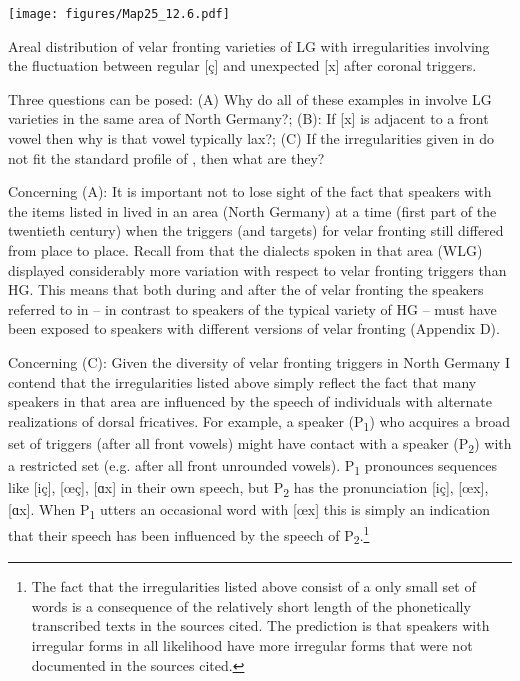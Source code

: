 \begin{map}
\texttt{[image: figures/Map25\_12.6.pdf]}
\caption[Areal distribution of velar fronting varieties of Low German]{Areal distribution of velar fronting varieties of LG with irregularities involving the fluctuation between regular [ç] and unexpected [x] after coronal triggers.}\label{map:25}
\end{map}

Three questions can be posed: (A) Why do all of these examples in  involve LG varieties in the same area of North Germany?; (B): If [x] is adjacent to a front vowel then why is that vowel typically lax?; (C) If the irregularities given in  do not fit the standard profile of , then what are they?

Concerning (A): It is important not to lose sight of the fact that speakers with the items listed in  lived in an area (North Germany) at a time (first part of the twentieth century) when the triggers (and targets) for velar fronting still differed from place to place. Recall from  that the dialects spoken in that area (WLG) displayed considerably more variation with respect to velar fronting triggers than HG. This means that both during and after the  of velar fronting the speakers referred to in  -- in contrast to speakers of the typical variety of HG -- must have been exposed to speakers with different versions of velar fronting (Appendix D).

Concerning (C): Given the diversity of velar fronting triggers in North Germany I contend that the irregularities listed above simply reflect the fact that many speakers in that area are influenced by the speech of individuals with alternate realizations of dorsal fricatives. For example, a speaker (P\textsubscript{1}) who acquires a broad set of triggers (after all front vowels) might have contact with a speaker (P\textsubscript{2}) with a restricted set (e.g. after all front unrounded vowels). P\textsubscript{1} pronounces sequences like [iç], [œç], [ɑx] in their own speech, but P\textsubscript{2} has the pronunciation [iç], [œx], [ɑx]. When P\textsubscript{1} utters an occasional word with [œx] this is simply an indication that their speech has been influenced by the speech of P\textsubscript{2}.\footnote{{The fact that the irregularities listed above consist of a only small set of words is a consequence of the relatively short length of the phonetically transcribed texts in the sources cited. The prediction is that speakers with irregular forms in all likelihood have more irregular forms that were not documented in the sources cited.}}

